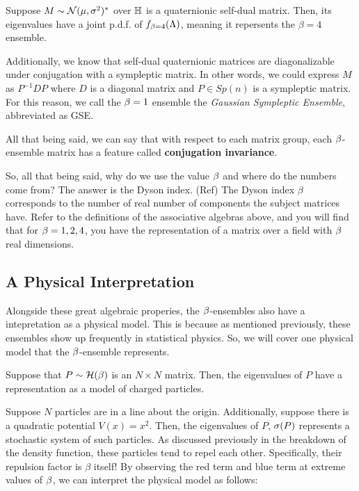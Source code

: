 \bigskip

 Suppose $M \sim \mathcal{N}(\mu,\sigma^2)^*$ over $\mathbb{H}$ is a quaternionic self-dual matrix.
Then, its eigenvalues have a joint p.d.f. of $f_{\beta = 4}(\Lambda)$, meaning it repersents the $\beta = 4$ ensemble.

Additionally, we know that self-dual quaternionic matrices are diagonalizable under conjugation with a sympleptic matrix.
In other words, we could express $M$ as $P^{-1} D P$ where $D$ is a diagonal matrix and $P \in Sp(n)$ is a sympleptic matrix.
For this reason, we call the $\beta = 1$ ensemble the \textit{Gaussian Sympleptic Ensemble}, abbreviated as GSE.

\bigskip

All that being said, we can say that with respect to each matrix group, each $\beta$-ensemble matrix has a feature called
\textbf{conjugation invariance}.

\newpage

So, all that being said, why do we use the value $\beta$ and where do the numbers come from? The answer is the Dyson index. (Ref)
The Dyson index $\beta$ corresponds to the number of real number of components the subject matrices have. Refer to the definitions
of the associative algebras above, and you will find that for $\beta = 1,2,4$, you have the representation of a matrix over a field with $\beta$ real dimensions.


\newpage
\subsection{A Physical Interpretation}

Alongside these great algebraic properies, the $\beta$-ensembles also have a intepretation as a physical model.
This is because as mentioned previously, these ensembles show up frequently in statistical physics.
So, we will cover one physical model that the $\beta$-ensemble represents.

Suppose that $P \sim \mathcal{H}(\beta)$ is an $N \times N$ matrix. Then, the eigenvalues of $P$ have a representation as a model of charged particles.


Suppose $N$ particles are in a line about the origin. Additionally, suppose there is a quadratic potential $V(x) = x^2$.
Then, the eigenvalues of $P$, $\sigma(P)$ represents a stochastic system of such particles. As discussed previously in the breakdown of the density function,
these particles tend to repel each other. Specifically, their repulsion factor is $\beta$ itself! By observing the red term and blue term at extreme values of $\beta$,
we can interpret the physical model as follows:
\medskip


